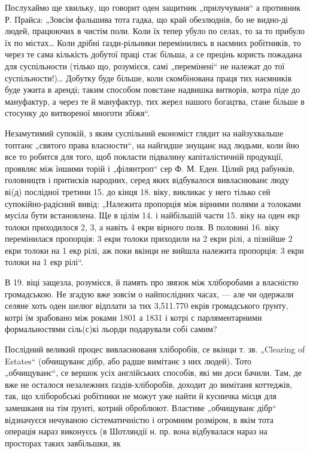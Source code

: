 Послухаймо ще хвильку, що говорит оден защитник „прилучуваня“ а противник Р. Прайса: „Зовсім
фальшива тота гадка, що край обезлюднів, бо не видно-ді людей, працюючих в чистім поли. Коли їх
тепер убуло по селах, то за то прибуло їх по містах\dots{} Коли дрібні ґазди-рільники перемінились в
наємних робітників, то через те сама кількість добутої праці стає більша, а се прецінь користь
пожадана для суспільности (тілько що, розумієся, самі „перемінені“ не належат до тої
суспільности!)\dots{} Добутку буде більше, коли скомбінована праця тих наємників буде ужита в 
аренді; таким способом повстане надвишка витворів, котра піде до мануфактур, а через те й
мануфактур, тих жерел нашого богацтва, стане більше в стосунку до витвореної многоти збіжя“.

Незамутимий супокій, з яким суспільний економіст глядит на найзухвальше топтанє „святого права
власности“, на найгидше знущанє над людьми, коли йно все то робится для того, щоб покласти підвалину
капіталістичній продукції, проявляє між їншими торій і „філянтроп“ сер Ф. М. Еден. Цілий ряд
рабунків, головництв і притисків народних, серед яких відбувалося вивласнюванє люду ві(д) послідної
третини 15. до кінця 18. віку, викликає у него тілько сей супокійно-радісний вивід: „Належита
пропорція між вірними полями а толоками мусіла бути встановлена. Ще в цілім 14. і найбільшій части
15. віку на оден екр толоки приходилося 2, 3, а навіть 4 екри вірного поля. В половині 16. віку
перемінилася пропорція: 3 екри толоки приходили на 2 екри рілі, а пізнійше 2 екри толоки на 1 екр
рілі, аж поки вкінци не вийшла належита пропорція: 3 екри толоки на 1 екр рілі“.

В 19. віці защезла, розумієся, й память про звязок між хліборобами а власністю громадською. Не
згадую вже зовсім о найпослідних часах, — але чи одержали селяне хоть оден шелюг відплати за тих
3,511.770 екрів громадського ґрунту, котрі їм зрабовано між роками 1801 а 1831 і котрі с
парляментарними формальностями сіль(с)кі льорди подарували собі самим?

Послідний великий процес вивласнюваня хліборобів, се вкінци т. зв. „\textenglish{Clearing of Estates}“ (обчищуванє
дібр, або радше вимітанє з них людей). Тото „обчищуванє“, се вершок усіх англійських способів, які
ми доси бачили. Там, де вже не осталося незалежних ґаздів-хліборобів, доходит до вимітаня коттеджів,
так, що хліборобські робітники не можут уже найти й кусничка місця для замешканя на тім ґрунті,
котрий оброблюют. Властиве „обчищуванє дібр“ відзначуєся нечуваною сістематичністю і огромним
розміром, в якім тота операція нараз виконуєсь (в Шотляндії н. пр.
вона відбувалася нараз на просторах таких завбільшки, як
\parbreak{}
